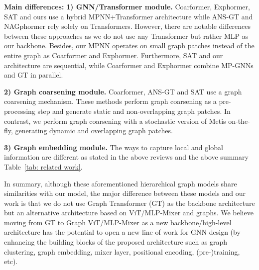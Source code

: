 \documentclass{article}
\begin{document}
\textbf{Main differences:}
\textbf{1) GNN/Transformer module.} Coarformer, Exphormer, SAT and ours use a hybrid MPNN+Transformer architecture while ANS-GT and NAGphormer rely solely on Transformers. However, there are notable differences between these approaches as we do not use any Transformer but rather MLP as our backbone. Besides, our MPNN operates on small graph patches instead of the entire graph as Coarformer and Exphormer. Furthermore, SAT and our architecture are sequential, while Coarformer and Exphormer combine MP-GNNs and GT in parallel.

\textbf{2) Graph coarsening module.} Coarformer, ANS-GT and SAT use a graph coarsening mechanism. These methods perform graph coarsening as a pre-processing step and generate static and non-overlapping graph patches. In contrast, we perform graph coarsening with a stochastic version of Metis on-the-fly, generating dynamic and overlapping graph patches. 



\textbf{3) Graph embedding module.} The ways to capture local and global information are different as stated in the above reviews and the above summary Table~\ref{tab: related work}.

In summary, although these aforementioned hierarchical graph models share similarities with our model, the major difference between these models and our work is that we do not use Graph Transformer (GT) as the backbone architecture but an alternative architecture based on ViT/MLP-Mixer and graphs. We believe moving from GT to Graph ViT/MLP-Mixer as a new backbone/high-level architecture has the potential to open a new line of work for GNN design (by enhancing the building blocks of the proposed architecture such as graph clustering, graph embedding, mixer layer, positional encoding, (pre-)training, etc). 
\end{document}
